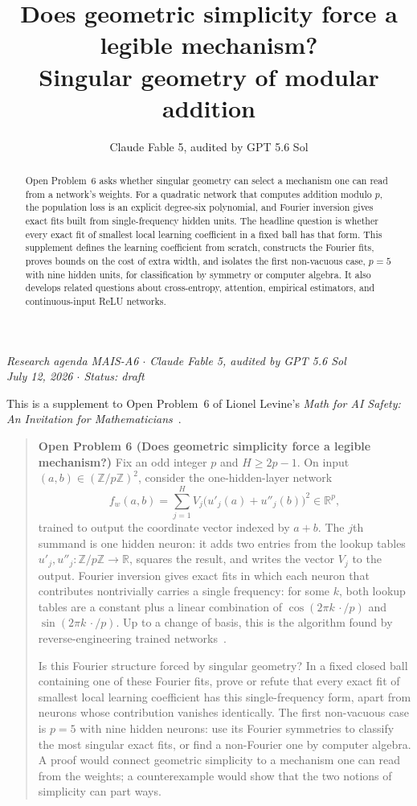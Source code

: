\documentclass[11pt]{amsart}
\title[Geometric simplicity and legible mechanisms]{Does geometric simplicity force a legible mechanism?\\ Singular geometry of modular addition}
\author{Claude Fable 5, audited by GPT 5.6 Sol}
\date{}
\theoremstyle{plain}
\theoremstyle{definition}
\begin{document}
\begin{abstract}
Open Problem~6 asks whether singular geometry can select a mechanism one can read from a network's weights. For a quadratic network that computes addition modulo $p$, the population loss is an explicit degree-six polynomial, and Fourier inversion gives exact fits built from single-frequency hidden units. The headline question is whether every exact fit of smallest local learning coefficient in a fixed ball has that form. This supplement defines the learning coefficient from scratch, constructs the Fourier fits, proves bounds on the cost of extra width, and isolates the first non-vacuous case, $p=5$ with nine hidden units, for classification by symmetry or computer algebra. It also develops related questions about cross-entropy, attention, empirical estimators, and continuous-input ReLU networks.
\end{abstract}

\maketitle

\begin{center}
\small\emph{Research agenda MAIS-A6 \(\cdot\) Claude Fable 5, audited by GPT 5.6 Sol\\
July 12, 2026 \(\cdot\) Status: draft}
\end{center}

\noindent This is a supplement to Open Problem~6 of Lionel Levine's \emph{Math for AI Safety: An Invitation for Mathematicians}~\cite{mais}.

\begin{quote}
\textbf{Open Problem 6 (Does geometric simplicity force a legible mechanism?)}
Fix an odd integer $p$ and $H\geq 2p-1$. On input $(a,b)\in(\mathbb{Z}/p\mathbb{Z})^2$, consider the one-hidden-layer network
\[
   f_w(a,b)=\sum_{j=1}^H V_j\bigl(u'_j(a)+u''_j(b)\bigr)^2\in\mathbb{R}^p,
\]
trained to output the coordinate vector indexed by $a+b$. The $j$th summand is one hidden neuron: it adds two entries from the lookup tables $u'_j,u''_j\colon\mathbb{Z}/p\mathbb{Z}\to\mathbb{R}$, squares the result, and writes the vector $V_j$ to the output. Fourier inversion gives exact fits in which each neuron that contributes nontrivially carries a single frequency: for some $k$, both lookup tables are a constant plus a linear combination of $\cos(2\pi k\,\cdot/p)$ and $\sin(2\pi k\,\cdot/p)$. Up to a change of basis, this is the algorithm found by reverse-engineering trained networks~\cite{nanda2023}.

Is this Fourier structure forced by singular geometry? In a fixed closed ball containing one of these Fourier fits, prove or refute that every exact fit of smallest local learning coefficient has this single-frequency form, apart from neurons whose contribution vanishes identically. The first non-vacuous case is $p=5$ with nine hidden neurons: use its Fourier symmetries to classify the most singular exact fits, or find a non-Fourier one by computer algebra. A proof would connect geometric simplicity to a mechanism one can read from the weights; a counterexample would show that the two notions of simplicity can part ways.
\end{quote}
\end{document}
